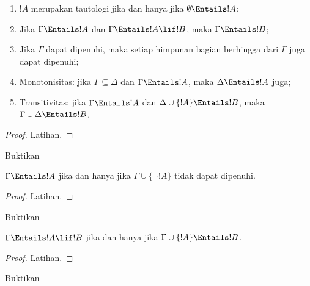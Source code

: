 \documentclass[../../../include/open-logic-section]{subfiles}
\begin{document}
\begin{prop}
\begin{enumerate} 
\item $!A$ merupakan tautologi jika dan hanya jika
  $\emptyset \Entails !A$; 
\item Jika $\Gamma \Entails !A$ dan $\Gamma \Entails !A \lif !B$, maka
  $\Gamma \Entails !B$;
\item Jika $\Gamma$ dapat dipenuhi, maka setiap himpunan bagian berhingga
  dari $\Gamma$ juga dapat dipenuhi; 
\item {} Monotonisitas: jika $\Gamma \subseteq \Delta$
  dan $\Gamma \Entails !A$, maka $\Delta \Entails !A$ juga;
\item {} Transitivitas: jika $\Gamma \Entails !A$ dan
  $\Delta \cup \{ !A\} \Entails !B$, maka $\Gamma \cup \Delta \Entails
  !B$.
\end{enumerate}
\end{prop}

\begin{proof}
Latihan.
\end{proof}

\begin{prob}
Buktikan 
\end{prob}

\begin{prop}
  $\Gamma \Entails !A$ jika dan hanya jika $\Gamma \cup \{\lnot !A\}$
  tidak dapat dipenuhi.
\end{prop}

\begin{proof}
Latihan.
\end{proof}

\begin{prob}
Buktikan 
\end{prob}

\begin{thm}
   $\Gamma \Entails !A \lif !B$ jika dan hanya
  jika $\Gamma \cup \{!A\} \Entails !B$.
\end{thm}

\begin{proof}
Latihan.
\end{proof}

\begin{prob}
Buktikan 
\end{prob}
\end{document}
